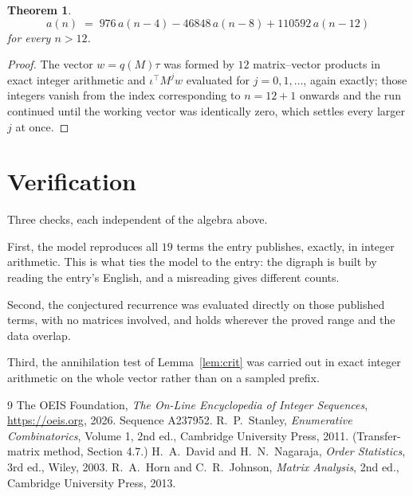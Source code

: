 \documentclass[11pt,a4paper]{article}
\theoremstyle{plain}
\newtheorem{theorem}{Theorem}
\theoremstyle{definition}
\begin{document}
\begin{theorem}
\[
a(n)\;=\;976\,a(n-4) - 46848\,a(n-8) + 110592\,a(n-12)
\]
for every $n>12$.
\end{theorem}

\begin{proof}
The vector $w=q(M)\tau$ was formed by $12$ matrix--vector products in exact integer
arithmetic and $\iota^{\!\top}M^{j}w$ evaluated for $j=0,1,\dots$, again exactly; those
integers vanish from the index corresponding to $n=12+1$ onwards and the run continued
until the working vector was identically zero, which settles every larger $j$ at once.
\end{proof}

\section{Verification}

Three checks, each independent of the algebra above.

First, the model reproduces all $19$ terms the entry publishes, exactly, in integer
arithmetic. This is what ties the model to the entry: the digraph is built by reading the
entry's English, and a misreading gives different counts.

Second, the conjectured recurrence was evaluated directly on those published terms, with no
matrices involved, and holds wherever the proved range and the data overlap.

Third, the annihilation test of Lemma~\ref{lem:crit} was carried out in exact integer
arithmetic on the whole vector rather than on a sampled prefix.

\begin{thebibliography}{9}
 The OEIS Foundation, \emph{The On-Line Encyclopedia of Integer
Sequences}, \url{https://oeis.org}, 2026. Sequence A237952.
 R.~P.~Stanley, \emph{Enumerative Combinatorics}, Volume 1, 2nd ed.,
Cambridge University Press, 2011. (Transfer-matrix method, Section 4.7.)
 H.~A.~David and H.~N.~Nagaraja, \emph{Order Statistics}, 3rd ed., Wiley,
2003.
 R.~A.~Horn and C.~R.~Johnson, \emph{Matrix Analysis}, 2nd ed., Cambridge
University Press, 2013.
\end{thebibliography}
\end{document}
